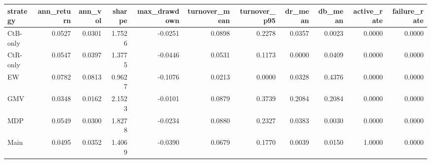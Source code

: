 \begin{tabular}{lrrrrrrrrrr}
\toprule
strategy & ann_return & ann_vol & sharpe & max_drawdown & turnover_mean & turnover_p95 & dr_mean & db_mean & active_rate & failure_rate \\
\midrule
CtB-only & 0.0527 & 0.0301 & 1.7526 & -0.0251 & 0.0898 & 0.2278 & 0.0357 & 0.0023 & 0.0000 & 0.0000 \\
CtR-only & 0.0547 & 0.0397 & 1.3775 & -0.0446 & 0.0531 & 0.1173 & 0.0000 & 0.0409 & 0.0000 & 0.0000 \\
EW & 0.0782 & 0.0813 & 0.9627 & -0.1076 & 0.0213 & 0.0000 & 0.0328 & 0.4376 & 0.0000 & 0.0000 \\
GMV & 0.0348 & 0.0162 & 2.1523 & -0.0101 & 0.0879 & 0.3739 & 0.2084 & 0.2084 & 0.0000 & 0.0000 \\
MDP & 0.0549 & 0.0300 & 1.8278 & -0.0234 & 0.0880 & 0.2327 & 0.0383 & 0.0030 & 0.0000 & 0.0000 \\
Main & 0.0495 & 0.0352 & 1.4069 & -0.0390 & 0.0679 & 0.1770 & 0.0039 & 0.0150 & 1.0000 & 0.0000 \\
\bottomrule
\end{tabular}
